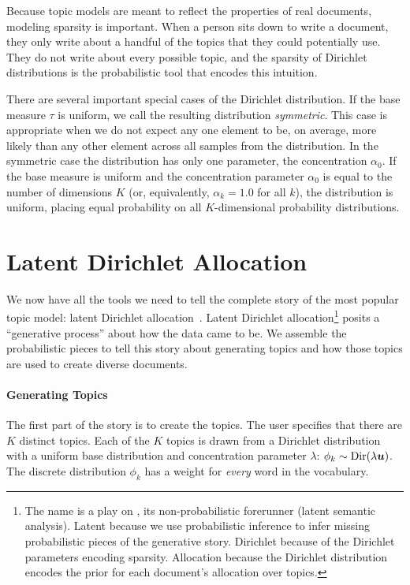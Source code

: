Because topic models are meant to reflect the properties of real documents, modeling sparsity is important.  When a person sits down to write a document, they only
write about a handful of the topics that they could potentially use.  They do not write about every possible topic, and the sparsity of Dirichlet distributions is the probabilistic
tool that encodes this intuition.

There are several important special cases of the Dirichlet distribution.
If the base measure $\tau$ is uniform, we call the resulting distribution {\em symmetric}.
This case is appropriate when we do not expect any one element to be, on average, more likely than any other element across all samples from the distribution.
In the symmetric case the  distribution has only one parameter, the concentration $\alpha_0$.
If the base measure is uniform and the concentration parameter $\alpha_0$ is equal to the number of dimensions $K$ (or, equivalently, $\alpha_k = 1.0$ for all $k$), the distribution is uniform, placing equal probability on all $K$-dimensional probability distributions.


\section{Latent Dirichlet Allocation}
\label{sec:lda}

We now have all the tools we need to tell the complete story of the most popular topic model: latent Dirichlet allocation~\citep[]{blei-03}.  Latent
Dirichlet allocation\footnote{The name  is a play on , its
  non-probabilistic forerunner (latent semantic analysis).  Latent because we
  use probabilistic inference to infer missing probabilistic pieces of the
  generative story.  Dirichlet because of the Dirichlet parameters encoding
  sparsity.  Allocation because the Dirichlet distribution encodes the prior for
  each document's allocation over topics.} posits a ``generative process'' about
how the data came to be.  We assemble the probabilistic pieces to tell
this story about generating topics and how those topics are used to create
diverse documents.

\paragraph{Generating Topics}

The first part of the story is to create the topics.  The user specifies that
there are $K$ distinct topics.  Each of the $K$ topics is drawn from a Dirichlet
distribution with a uniform base distribution and concentration parameter
$\lambda$: $\phi_k \sim \mbox{Dir}(\lambda {\bm u})$.  The discrete distribution
$\phi_k$ has a weight for \emph{every} word in the vocabulary.

